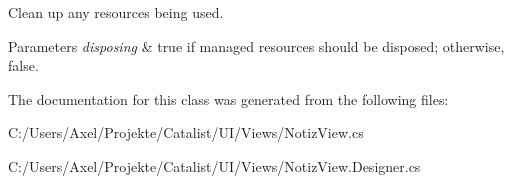 Clean up any resources being used. 


\begin{DoxyParams}{Parameters}
{\em disposing} & true if managed resources should be disposed; otherwise, false.\\
\hline
\end{DoxyParams}


The documentation for this class was generated from the following files\+:\begin{DoxyCompactItemize}
\item 
C\+:/\+Users/\+Axel/\+Projekte/\+Catalist/\+U\+I/\+Views/Notiz\+View.\+cs\item 
C\+:/\+Users/\+Axel/\+Projekte/\+Catalist/\+U\+I/\+Views/Notiz\+View.\+Designer.\+cs\end{DoxyCompactItemize}
